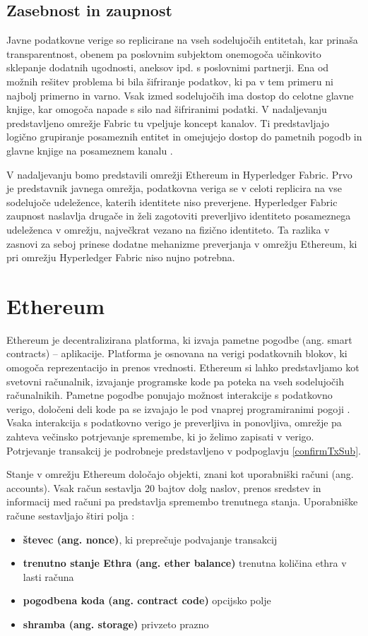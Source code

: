 \documentclass[a4paper, 12pt]{book}
\begin{document}
\subsection{Zasebnost in zaupnost}
Javne podatkovne verige so replicirane na vseh sodelujočih entitetah, kar prinaša transparentnost, obenem pa poslovnim subjektom onemogoča učinko\-vito sklepanje dodatnih ugodnosti, aneksov ipd. s poslovnimi partnerji.
Ena od možnih rešitev problema bi bila šifriranje podatkov, ki pa v tem primeru ni najbolj primerno in varno.
Vsak izmed sodelujočih ima dostop do celotne glavne knjige, kar omogoča napade s silo nad šifriranimi podatki.
V nadaljevanju predstavljeno omrežje Fabric tu vpeljuje koncept kanalov.
Ti predstavljajo logično grupiranje posameznih entitet in omejujejo dostop do pametnih pogodb in glavne knjige na posameznem kanalu \cite{hyperledgerDocs}.

V nadaljevanju bomo predstavili omrežji Ethereum in Hyperledger Fabric.
Prvo je predstavnik javnega omrežja, podatkovna veriga se v celoti replicira na vse sodelujoče udeležence, katerih identitete niso preverjene.
Hyperledger Fabric zaupnost naslavlja drugače in želi zagotoviti preverljivo identiteto posameznega udeleženca v omrežju, največkrat vezano na fizično identiteto.
Ta razlika v zasnovi za seboj prinese dodatne mehanizme preverjanja v omrežju Ethereum, ki pri omrežju Hyperledger Fabric niso nujno potrebna.

\section{Ethereum}
Ethereum je decentralizirana platforma, ki izvaja pametne pogodbe (ang. smart contracts) -- aplikacije.
Platforma je osnovana na verigi podatkovnih blokov, ki omogoča reprezentacijo in prenos vrednosti.
Ethereum si lahko predstavljamo kot svetovni računalnik, izvajanje programske kode pa poteka na vseh sodelujočih računalnikih.
Pametne pogodbe ponujajo možnost interakcije s podatkovno verigo, določeni deli kode pa se izvajajo le pod vnaprej programiranimi pogoji \cite{ethereumWhitepaper}.
Vsaka interakcija s podatkovno verigo je preverljiva in ponovljiva, omrežje pa zahteva večinsko potrjevanje spremembe, ki jo želimo zapisati v verigo.
Potrjevanje transakcij je podrobneje predstavljeno v podpoglavju \ref{confirmTxSub}.

Stanje v omrežju Ethereum določajo objekti, znani kot uporabniški računi (ang. accounts).
Vsak račun sestavlja 20 bajtov dolg naslov, prenos sredstev in informacij med računi pa predstavlja spremembo trenutnega stanja.
Uporabniške račune sestavljajo štiri polja \cite{ethereumWhitepaper}:
\begin{itemize}
\item \textbf{števec (ang. nonce)}, ki preprečuje podvajanje transakcij
\item \textbf{trenutno stanje Ethra (ang. ether balance)} trenutna količina ethra v lasti računa
\item \textbf{pogodbena koda (ang. contract code)} opcijsko polje
\item \textbf{shramba (ang. storage)} privzeto prazno
\end{itemize}
\end{document}
